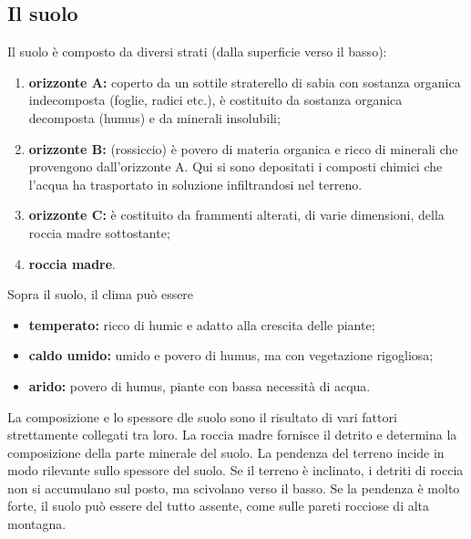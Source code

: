 \documentclass[a4paper]{article}
\begin{document}
\subsection{Il suolo}

Il suolo è composto da diversi strati (dalla superficie verso il basso):
\begin{enumerate}
    \item \textbf{orizzonte A:} coperto da un sottile
        straterello di sabia con sostanza organica indecomposta (foglie, radici etc.),
        è costituito da sostanza organica decomposta (humus) e da minerali insolubili;
    \item \textbf{orizzonte B:} (rossiccio) è povero di materia organica e ricco di minerali che provengono
        dall'orizzonte A. Qui si sono depositati i composti chimici che l'acqua ha trasportato in soluzione infiltrandosi nel terreno.
    \item \textbf{orizzonte C:} è costituito da frammenti alterati, di varie dimensioni, della roccia madre sottostante;
    \item \textbf{roccia madre}.
\end{enumerate}

Sopra il suolo, il clima può essere
\begin{itemize}
    \item \textbf{temperato:} ricco di humic e adatto alla crescita delle piante;
    \item \textbf{caldo umido:} umido e povero di humus, ma con vegetazione rigogliosa;
    \item \textbf{arido:} povero di humus, piante con bassa necessità di acqua.
\end{itemize}

La composizione e lo spessore dle suolo sono il risultato di vari fattori strettamente
collegati tra loro.
La roccia madre fornisce il detrito e determina la composizione della parte minerale del suolo.
La pendenza del terreno incide in modo rilevante sullo spessore del suolo.
Se il terreno è inclinato, i detriti di roccia non si accumulano sul posto, ma scivolano
verso il basso.
Se la pendenza è molto forte, il suolo può essere del tutto assente, come
sulle pareti rocciose di alta montagna.
\end{document}
